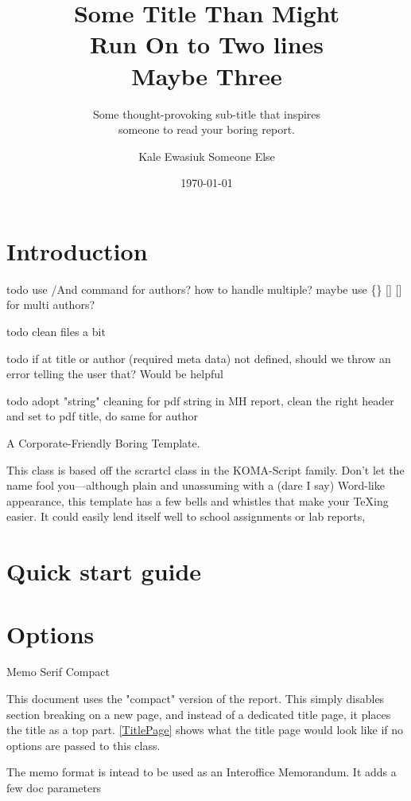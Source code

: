 \documentclass[compact]{corpboreport}
\title{Some Title Than Might\\Run On to Two lines\\Maybe Three\\}
\author{Kale Ewasiuk \And Someone Else}
\subtitle{Some thought-provoking sub-title that inspires\\
		someone to read your boring report.}
\date{\today}
\begin{document}



\maketitle


%

\section{Introduction}
todo use /And command for authors? how to handle multiple? maybe use \{\} [] [] for multi authors?

todo clean files a bit

todo if at title or author (required meta data) not defined, should we throw an error telling the user that? Would be helpful

todo adopt "string" cleaning for pdf string in MH report, clean the right header and set to pdf title, do same for author

A Corporate-Friendly Boring Template.

This class is based off the scrartcl class in the KOMA-Script family.
Don't let the name fool you---although plain and unassuming with a (dare I say) Word-like appearance,
this template has a few bells and whistles that make your TeXing easier.
It could easily lend itself well to school assignments or lab reports,

\section{Quick start guide}

\section{Options}
Memo
Serif
Compact


This document uses the "compact" version of the report. This simply disables section breaking on a new page,
and instead of a dedicated title page, it places the title as a top part. \cref{TitlePage} shows
what the title page would look like if no options are passed to this class.

The memo format is intead to be used as an Interoffice Memorandum. It adds a few doc parameters
\end{document}
